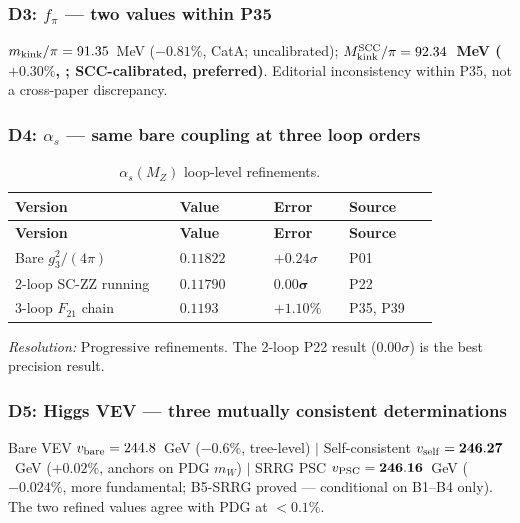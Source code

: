\subsubsection*{D3: $f_\pi$ — two values within P35}

\noindent$m_{\rm kink}/\pi = 91.35$~MeV ($-0.81\%$, CatA; uncalibrated);
\textbf{$M_{\rm kink}^{\rm SCC}/\pi = 92.34$~MeV ($+0.30\%$, \CatAL; SCC-calibrated, preferred)}.
Editorial inconsistency within P35, not a cross-paper discrepancy.

\subsubsection*{D4: $\alpha_s$ — same bare coupling at three loop orders}

\begingroup\footnotesize\renewcommand{\arraystretch}{1.2}
\begin{longtable}{@{}P{0.35\linewidth}P{0.20\linewidth}P{0.16\linewidth}P{0.19\linewidth}@{}}
\caption{$\alpha_s(M_Z)$ loop-level refinements.}\label{tab:disc-alphas}\\
\toprule
\textbf{Version} & \textbf{Value} & \textbf{Error} & \textbf{Source} \\
\midrule \endfirsthead \midrule
\textbf{Version} & \textbf{Value} & \textbf{Error} & \textbf{Source} \\
\midrule \endhead \bottomrule \endfoot
Bare $g_3^2/(4\pi)$ & $0.11822$ & $+0.24\sigma$ & P01 \\
2-loop SC-ZZ running & $\mathbf{0.11790}$ & $\mathbf{0.00\sigma}$ & P22 \\
3-loop $F_{21}$ chain & $0.1193$ & $+1.10\%$ & P35, P39 \\
\end{longtable}
\endgroup

\noindent\textit{Resolution:} Progressive refinements.
The 2-loop P22 result ($0.00\sigma$) is the best precision result.

\subsubsection*{D5: Higgs VEV — three mutually consistent determinations}

\noindent
Bare VEV $v_{\rm bare} = 244.8$~GeV ($-0.6\%$, tree-level) $|$
Self-consistent $v_{\rm self} = \mathbf{246.27}$~GeV ($\mathbf{+0.02\%}$, anchors on PDG $m_W$) $|$
SRRG PSC $v_{\rm PSC} = \mathbf{246.16}$~GeV ($\mathbf{-0.024\%}$, more fundamental; B5-SRRG proved --- conditional on B1--B4 only).
The two refined values agree with PDG at $<0.1\%$.

